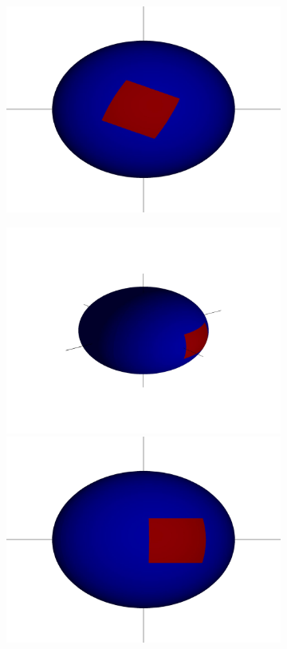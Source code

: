 \documentclass[11pt]{article}
\begin{document}
\begin{figure}
\begin{subfigure}{0.2\textwidth}
\includegraphics[width=\textwidth]{sphere2_2}
\caption{}
\end{subfigure}
\begin{subfigure}{0.2\textwidth}
\includegraphics[width=\textwidth]{sphere_3}
\includegraphics[width=\textwidth]{sphere2_3}

\end{subfigure}
\end{figure}
\end{document}

